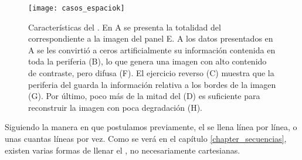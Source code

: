 \begin{figure}[htb]
 \begin{figg}
   \texttt{[image: casos\_espaciok]}
   \caption{Características del \espaciok. En A se presenta la totalidad del \espaciok correspondiente a la imagen del panel E. A los datos presentados en A se les convirtió a ceros artificialmente su información contenida en toda la periferia (B), lo que genera una imagen con alto contenido de contraste, pero difusa (F). El ejercicio reverso (C) muestra que la periferia del \espaciok guarda la información relativa a los bordes de la imagen (G). Por último, poco más de la mitad del \espaciok (D) es suficiente para reconstruir la imagen con poca degradación (H).}
 \label{fig:casos_espaciok}
 \end{figg}
\end{figure}


Siguiendo la manera en que postulamos previamente, el \espaciok se llena línea por línea, o unas cuantas líneas por vez. Como se verá en el capítulo \ref{chapter_secuencias}, existen varias formas de llenar el \espaciok, no necesariamente cartesianas.







